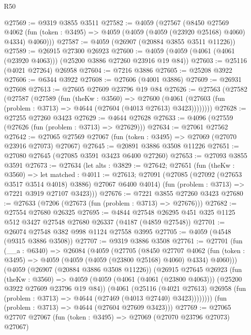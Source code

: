 \begin{lexlean}{R50}
\begin{coremodule}
@27569 := @9319 @3855 @3511
@27582 := @4059
    (@27567
      (@8450
        @27569
        @4062
        (fun (token : @3495) => @4059 (@4059 (@4059 (@23920 @25168) @4060) @4334) @4060)))
@27587 := @4059 (@26907 (@20884 @3855 @3511 @11226))
@27589 := @26915 @27300 @26923
@27600 := @4059 (@4059 (@4061 (@4061 (@23920 @4063))) (@25200 @3886 @27260 @23916 @19 @84))
@27603 := @25116 (@4021 @27264) @26958
@27604 := @7216 @3886
@27605 := @25208 @3922
@27606 := @6344 @3922
@27608 := @27606 (@4001 @3886)
@27609 := @26931 @27608
@27613 := @27605 @27609 @23796 @19 @84
@27626 := @27563
    (@27582
      (@27587
        (@27589
          (fun (theKw : @3560) =>
          @27600 (@4061 (@27603 (fun (problem : @3713) => @4644 (@27604 (@4013 @27613) @3423))))))))
@27628 := @27255 @27260 @3423
@27629 := @4644 @27628
@27633 := @4096 (@27559 (@27626 (fun (problem : @3713) => @27629)))
@27634 := @27061 @27562
@27642 := @27065 @27569 @27067 (fun (token : @3495) => @27069 (@27070 @23916 @27073) @27067)
@27645 := @20891 @3886 @3508 @11226
@27651 := @27080 @27645 (@27085 @3591 @3423 @6400 @27260)
@27653 := @27093 @3855 @3591
@27673 := @27634
    (let alts : @3829 := @27642;
    @27651
      (fun (theKw : @3560) =>
      let matched : @4011 := @27613;
      @27091
        (@27085 (@27092 (@27653 @3517 @3514 @4018) @3886) @27067 @6400 @4014)
        (fun (problem : @3713) => @7221 @3919 @27107 @3423)))
@27676 := @7221 @3855 @27260 @3423
@27680 := @27633 (@7206 (@27673 (fun (problem : @3713) => @27676)))
@27682 := @27554 @27680 @26325
@27695 := @4844 @27548 @26295 @451 @325 @1125 @512 @3427 @27548 @27680 @26337 (@4187 (@4859 @27548))
@27701 := @26074 @27548 @382 @998 @1124 @27558 @3995
@27705 := @4059 (@4548 (@9315 @3886 @3508))
@27707 := @9319 @3886 @3508
@27761 := @27701
    (fun (__a : @6340) =>
    @26084
      (@4059
        (@27705
          (@8450
            @27707
            @4062
            (fun (token : @3495) => @4059 (@4059 (@4059 (@23800 @25168) @4060) @4334) @4060)))
        (@4059
          (@26907 (@20884 @3886 @3508 @11226))
          (@26915
            @27645
            @26923
            (fun (theKw : @3560) =>
            @4059
              (@4059 (@4061 (@4061 (@23800 @4063))) (@25200 @3922 @27609 @23796 @19 @84))
              (@4061
                (@25116
                  (@4021 @27613)
                  @26958
                  (fun (problem : @3713) => @4644 (@27469 (@4013 @27440) @3423))))))))
      (fun (problem : @3713) => @4644 (@27604 @27609 @3423)))
@27769 := @27065 @27707 @27067 (fun (token : @3495) => @27069 (@27070 @23796 @27073) @27067)

\end{coremodule}
\end{lexlean}
